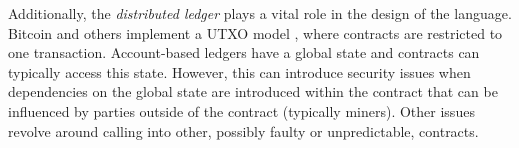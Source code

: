 Additionally, the \emph{distributed ledger} plays a vital role in the design of the language. Bitcoin and others implement a UTXO model \cite{Nakamoto2008,Covaci2018}, where contracts are restricted to one transaction. Account-based ledgers have a global state and contracts can typically access this state. 
However, this can introduce security issues when dependencies on the global state are introduced within the contract that can be influenced by parties outside of the contract (typically miners). Other issues revolve around calling into other, possibly faulty or unpredictable, contracts.





%
%
%
